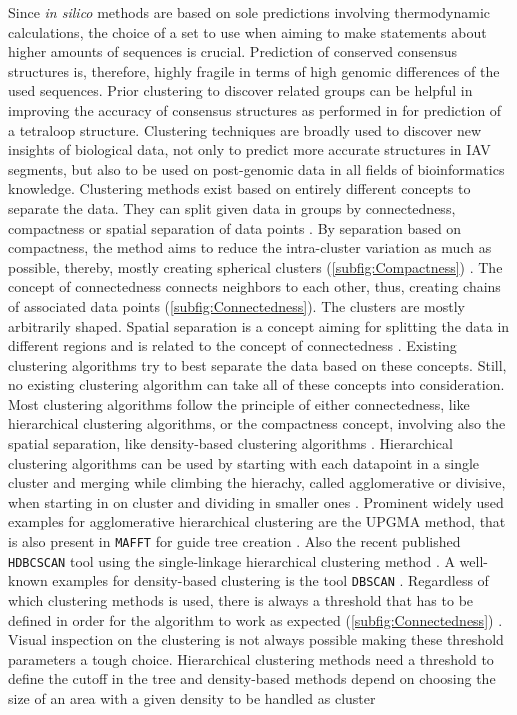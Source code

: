 Since \textit{in silico} methods are based on sole predictions involving thermodynamic calculations, the choice of a set to use when aiming to make statements about higher amounts of sequences is crucial. Prediction of conserved consensus structures is, therefore, highly fragile in terms of high genomic differences of the used sequences. Prior clustering to discover related groups can be helpful in improving the accuracy of consensus structures as performed in \textcite{moss_identification_2011} for prediction of a tetraloop structure. Clustering techniques are broadly used to discover new insights of biological data, not only to predict more accurate structures in \gls{IAV} segments, but also to be used on post-genomic data in all fields of bioinformatics knowledge\autocite{handl_computational_2005}. Clustering methods exist based on entirely different concepts to separate the data. They can split given data in groups by connectedness, compactness or spatial separation of data points \autocite{handl_computational_2005}. By separation based on compactness, the method aims to reduce the intra-cluster variation as much as possible, thereby, mostly creating spherical clusters (\autoref{subfig:Compactness}) \autocite{handl_computational_2005}. The concept of connectedness connects neighbors to each other, thus, creating chains of associated data points (\autoref{subfig:Connectedness}). The clusters are mostly arbitrarily shaped. Spatial separation is a concept aiming for splitting the data in different regions and is related to the concept of connectedness \autocite{handl_computational_2005}. Existing clustering algorithms try to best separate the data based on these concepts. Still, no existing clustering algorithm can take all of these concepts into consideration. Most clustering algorithms follow the principle of either connectedness, like hierarchical clustering algorithms, or the compactness concept, involving also the spatial separation, like density-based clustering algorithms \autocite{handl_computational_2005}. Hierarchical clustering algorithms can be used by starting with each datapoint in a single cluster and merging while climbing the hierachy, called agglomerative or divisive, when starting in on cluster and dividing in smaller ones \autocite{murtagh_algorithms_2012}. Prominent widely used examples for agglomerative hierarchical clustering are the \gls{UPGMA} method, that is also present in \texttt{MAFFT} for guide tree creation \autocite{katoh_mafft_2002}. Also the recent published \texttt{HDBCSCAN} tool using the single-linkage hierarchical clustering method \autocite{mcinnes_hdbscan_2017}. A well-known examples for density-based clustering is the tool \texttt{DBSCAN} \autocite{madhulatha_overview_2012, schubert_dbscan_2017}. Regardless of which clustering methods is used, there is always a threshold that has to be defined in order for the algorithm to work as expected (\autoref{subfig:Connectedness}) \autocite{madhulatha_overview_2012}. Visual inspection on the clustering is not always possible making these threshold parameters a tough choice. Hierarchical clustering methods need a threshold to define the cutoff in the tree and density-based methods depend on choosing the size of an area with a given density to be handled as cluster 
